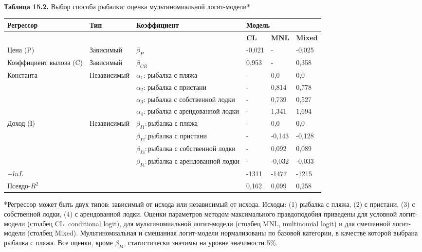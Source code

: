\textbf{Таблица 15.2. }Выбор способа рыбалки: оценка мультиномиальной логит-модели*

\begin{tabular}{|p{0.7in}|p{0.7in}|p{1.7in}|p{0.5in}|p{0.5in}|p{0.5in}|} \hline 
\textbf{Регрессор} & \textbf{Тип} & \textbf{Коэффициент} & \multicolumn{3}{|p{1.4in}|}{\textbf{Модель}} \\ \hline 
  &   &   & \textbf{CL} & \textbf{MNL} & \textbf{Mixed} \\ \hline 
Цена (P) & Зависимый & ${\beta }_P$ & -0,021 & - & -0,025 \\ \hline 
Коэффициент вылова (C) & Зависимый & ${\beta }_{CR}$ & 0,953 & - & 0,358 \\ \hline 
Константа  & Независимый & ${\alpha }_1$: рыбалка с пляжа & - & 0,0 & 0,0 \\ \hline 
 &  & ${\alpha }_2$: рыбалка с пристани & - & 0,814 & 0,778 \\ \hline 
 &  & ${\alpha }_3$: рыбалка с собственной лодки & - & 0,739 & 0,527 \\ \hline 
 &  & ${\alpha }_4$: рыбалка с арендованной лодки & - & 1,341 & 1,694 \\ \hline 
Доход (I) & Независимый & ${\beta }_{I1}:$рыбалка с пляжа & - & 0,0 & 0,0 \\ \hline 
 &  & ${\beta }_{I2}:$рыбалка с пристани & - & -0,143 & -0,128 \\ \hline 
 &  & ${\beta }_{I3}:$рыбалка с собственной лодки & - & 0,092 & 0,089 \\ \hline 
 &  & ${\beta }_{I4}:$рыбалка с арендованной лодки & - & -0,032 & -0,033 \\ \hline 
$-lnL$ &  &  & -1311 & -1477 & -1215 \\ \hline 
Псевдо-$R^2$ &  &  & 0,162 & 0,099 & 0,258 \\ \hline 
\end{tabular}

*Регрессор может быть двух типов: зависимый от исхода или независимый от исхода. Исходы: (1) рыбалка с пляжа, (2) с пристани, (3) с собственной лодки, (4) с арендованной лодки. Оценки параметров методом максимального правдоподобия приведены для условной логит-модели (столбец CL, conditional logit), для мультиномиальной логит-модели (столбец MNL, multinomial logit) и для смешанной логит-модели (столбец Mixed). Мультиномиальная и смешанная логит-модели нормализованы по базовой категории, в качестве которой выбрана рыбалка с пляжа. Все оценки, кроме ${\beta }_{I4}$, статистически значимы на уровне значимости 5\%.

